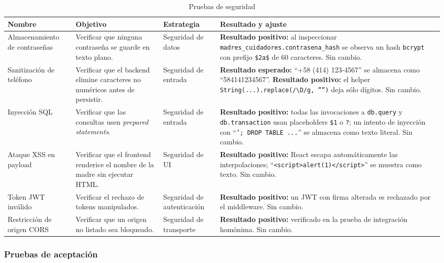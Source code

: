 \documentclass[12pt,letterpaper]{article}
\begin{document}
\begin{longtable}{p{}p{}p{}p{}}
\caption{Pruebas de seguridad}\\\toprule
\textbf{Nombre} & \textbf{Objetivo} & \textbf{Estrategia} & \textbf{Resultado y ajuste} \\\midrule
\endhead
Almacenamiento de contraseñas & Verificar que ninguna contraseña se guarde en texto plano. & Seguridad de datos & \textbf{Resultado positivo:} al inspeccionar \texttt{madres\_cuidadores.contrasena\_hash} se observa un hash \texttt{bcrypt} con prefijo \texttt{\$2a\$} de 60 caracteres. Sin cambio.\\\hline
Sanitización de teléfono & Verificar que el backend elimine caracteres no numéricos antes de persistir. & Seguridad de entrada & \textbf{Resultado esperado:} ``+58 (414) 123-4567'' se almacena como ``584141234567''. \textbf{Resultado positivo:} el helper \texttt{String(...).replace(/\textbackslash D/g, '''')} deja sólo dígitos. Sin cambio.\\\hline
Inyección SQL & Verificar que las consultas usen \textit{prepared statements}. & Seguridad de entrada & \textbf{Resultado positivo:} todas las invocaciones a \texttt{db.query} y \texttt{db.transaction} usan placeholders \texttt{\$1} o \texttt{?}; un intento de inyección con ``\texttt{'; DROP TABLE ...}'' se almacena como texto literal. Sin cambio.\\\hline
Ataque XSS en payload & Verificar que el frontend renderice el nombre de la madre sin ejecutar HTML. & Seguridad de UI & \textbf{Resultado positivo:} React escapa automáticamente las interpolaciones; ``\texttt{<script>alert(1)</script>}'' se muestra como texto. Sin cambio.\\\hline
Token JWT inválido & Verificar el rechazo de tokens manipulados. & Seguridad de autenticación & \textbf{Resultado positivo:} un JWT con firma alterada es rechazado por el middleware. Sin cambio.\\\hline
Restricción de origen CORS & Verificar que un origen no listado sea bloqueado. & Seguridad de transporte & \textbf{Resultado positivo:} verificado en la prueba de integración homónima. Sin cambio.\\\bottomrule
\end{longtable}

\subsubsection{Pruebas de aceptación}
\end{document}
